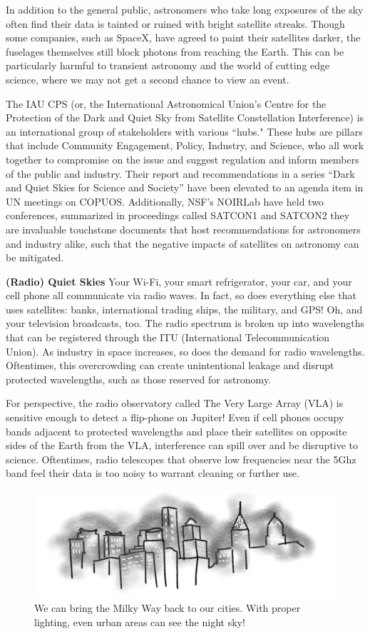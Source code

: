 In addition to the general public, astronomers who take long exposures of the sky often find their data is tainted or ruined with bright satellite streaks. Though some companies, such as SpaceX, have agreed to paint their satellites darker, the fuselages themselves still block photons from reaching the Earth. This can be particularly harmful to transient astronomy and the world of cutting edge science, where we may not get a second chance to view an event.

The IAU CPS (or, the International Astronomical Union's Centre for the Protection of the Dark and Quiet Sky from Satellite Constellation Interference) is an international group of stakeholders with various ``hubs." These hubs are pillars that include Community Engagement, Policy, Industry, and Science, who all work together to compromise on the issue and suggest regulation and inform members of the public and industry. Their report and recommendations in a series ``Dark and Quiet Skies for Science and Society”  have been elevated to an agenda item in UN meetings on COPUOS. Additionally, NSF’s NOIRLab have held two conferences, summarized in proceedings called SATCON1 and SATCON2 they are invaluable touchstone documents that host recommendations for astronomers and industry alike, such that the negative impacts of satellites on astronomy can be mitigated.

\textbf{(Radio) Quiet Skies} Your Wi-Fi, your smart refrigerator, your car, and your cell phone all communicate via radio waves. In fact, so does everything else that uses satellites: banks, international trading ships, the military, and GPS! Oh, and your television broadcasts, too. The radio spectrum is broken up into wavelengths that can be registered through the ITU (International Telecommunication Union). As industry in space increases, so does the demand for radio wavelengths. Oftentimes, this overcrowding can create unintentional leakage and disrupt protected wavelengths, such as those reserved for astronomy. 

For perspective, the radio observatory called The Very Large Array (VLA) is sensitive enough to detect a flip-phone on Jupiter! Even if cell phones occupy bands adjacent to protected wavelengths and place their satellites on opposite sides of the Earth from the VLA, interference can spill over and be disruptive to science. Oftentimes, radio telescopes that observe low frequencies near the 5Ghz band feel their data is too noisy to warrant cleaning or further use. 

\begin{figure}[h!]
    \centering
    \includegraphics[width=\linewidth]{img/lightpollution.png}
    \caption{We can bring the Milky Way back to our cities. With proper lighting, even urban areas can see the night sky! }
    \label{fig:lightpollution}
\end{figure}